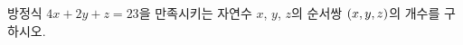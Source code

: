 방정식 $4x+2y+z=23$을 만족시키는 자연수 $x$, $y$, $z$의 순서쌍 $(x{,}\mkern3mu\mathopen{}y{,}\mkern3mu\mathopen{}z)$의 개수를 구하시오.
